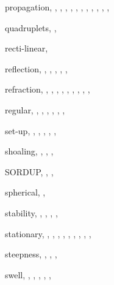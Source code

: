 \documentclass[12pt]{book}
\begin{document}
\begin{theindex}
  \indexspace

  \item propagation, , , 
		, , , 
		, , , 
		, , , 

  \indexspace

  \item quadruplets, , 

  \indexspace

  \item recti-linear, 
  \item reflection, , , , 
		, , 
  \item refraction, , , , 
		, , , 
		, , , 
  \item regular, , , , 
		, , , 

  \indexspace

  \item set-up, , , , 
		, , 
  \item shoaling, , , , 
  \item SORDUP, , , 
  \item spherical, , 
  \item stability, , , 
		, , 
  \item stationary, , , , 
		, , , 
		, , , 
  \item steepness, , , , 
  \item swell, , , , 
		, , 

  \indexspace


\end{theindex}
\end{document}
